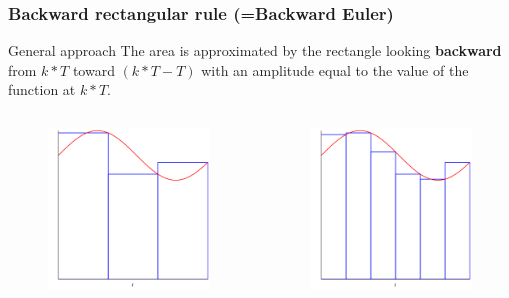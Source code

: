 \begin{frame}
	\frametitle{Backward rectangular rule (=Backward Euler)}
\begin{block}{General approach}
	The area is approximated by the rectangle looking \textbf{backward} from $k*T$ toward $(k*T - T)$ with an amplitude equal to the value of the function at $k*T$. 
\end{block}	

\begin{columns}
	\begin{column}{0.5\textwidth}
		\begin{figure}
			\centering
			\includegraphics[width=0.6\linewidth]{Backward1}
		\end{figure}
	\end{column}
		
	\begin{column}{0.5\textwidth}
		\begin{figure}
			\centering
			\includegraphics[width=0.6\linewidth]{Backward2}
		\end{figure}
	\end{column}
		
\end{columns}
\end{frame}

